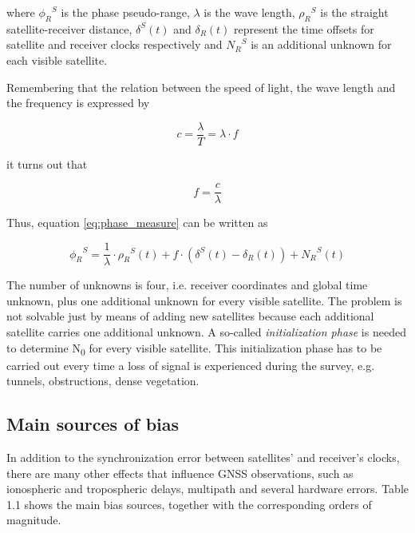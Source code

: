 where ${\phi_{R}}^{S}$ is the phase pseudo-range, $\lambda$ is the wave length, ${\rho_{R}}^{S}$ is the straight satellite-receiver distance, $\delta^{S}(t)$ and $\delta_{R}(t)$ represent the time offsets for satellite and receiver clocks respectively and ${N_{R}}^{S}$ is an additional unknown for each visible satellite.

Remembering that the relation between the speed of light, the wave length and the frequency is expressed by

\begin{equation}
	c=\frac{\lambda}{T}= \lambda \cdot f
	\label{eq:clambda1}
\end{equation}

it turns out that

\begin{equation}
	f=\frac{c}{\lambda}
	\label{eq:f}
\end{equation}

Thus, equation \ref{eq:phase_measure} can be written as

\begin{equation}
	{\phi_{R}}^{S} = \frac{1}{\lambda}\cdot {\rho_{R}}^{S}(t) + f \cdot \left(\delta^{S}(t) - \delta_{R}(t)\right)+ {N_{R}}^{S}(t)
	\label{eq:phase_measure1}
\end{equation}

The number of unknowns is four, i.e. receiver coordinates and global time unknown, plus one additional unknown for every visible satellite.
The problem is not solvable just by means of adding new satellites because each additional satellite carries one additional unknown. A so-called \textit{initialization phase} is needed to determine N\textsubscript{0} for every visible satellite. This initialization phase has to be carried out every time a loss of signal is experienced during the survey, e.g. tunnels, obstructions, dense vegetation.

\subsection{Main sources of bias}

In addition to the synchronization error between satellites' and receiver's clocks, there are many other effects that influence GNSS observations, such as ionospheric and tropospheric delays, multipath and several hardware errors. Table 1.1 shows the main bias sources, together with the corresponding orders of magnitude.

			
